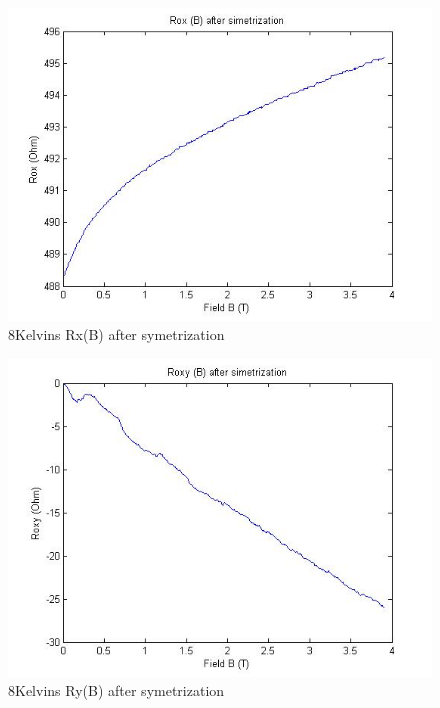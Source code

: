 \documentclass[idxtotoc,hyperref,openany,oneside]{labbook} %
\begin{document}
\begin{figure}[H] %
\begin{center}
\includegraphics[width=1\linewidth]{7468kRox.jpg}
\end{center}
\caption{8Kelvins Rx(B)  after symetrization} 
\label{fig:fig12}
\end{figure}


\begin{figure}[H] %
\begin{center}
\includegraphics[width=1\linewidth]{7468kRoxy.jpg}
\end{center}
\caption{8Kelvins Ry(B)  after symetrization} 
\label{fig:fig13}
\end{figure}
\end{document}
